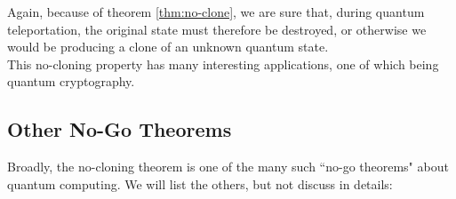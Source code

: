 \documentclass[12pt]{article}
\begin{document}
\begin{remark}
Again, because of theorem \ref{thm:no-clone}, we are sure that, during quantum teleportation, the original state must therefore be destroyed, or otherwise we would be producing a clone of an unknown quantum state.\\

\noindent This no-cloning property has many interesting applications, one of which being quantum cryptography.
\end{remark}

\subsection{Other No-Go Theorems}
Broadly, the no-cloning theorem is one of the many such ``no-go theorems" about quantum computing. We will list the others, but not discuss in details:
\end{document}

